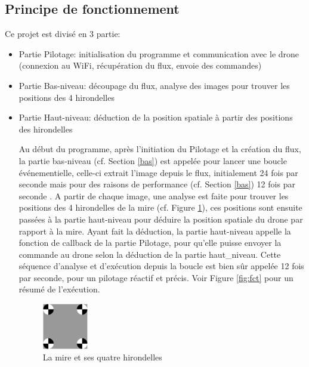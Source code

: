 \documentclass[12pt]{article}
\begin{document}
\subsection{Principe de fonctionnement\label{principe}}
Ce projet est divisé en 3 partie:
\begin{itemize}
    \item Partie Pilotage: initialisation du programme et communication avec le drone (connexion au WiFi, récupération du flux, envoie des commandes)
    \item Partie Bas-niveau: découpage du flux, analyse des images pour trouver les positions des 4 hirondelles
    \item Partie Haut-niveau: déduction de la position spatiale à partir des positions des hirondelles 
    
    Au début du programme, après l'initiation du Pilotage et la création du flux, la partie bas-niveau (cf. Section \ref{bas}) est appelée pour lancer une boucle événementielle, celle-ci extrait l'image depuis le flux, initialement 24 fois par seconde mais pour des raisons de performance (cf. Section \ref{bas}) 12 fois par seconde . A partir de chaque image, une analyse est faite pour trouver les positions des 4 hirondelles de la mire (cf. Figure \ref{fig:mire}), ces positions sont ensuite passées à la partie haut-niveau pour déduire la position spatiale du drone par rapport à la mire. Ayant fait la déduction, la partie haut-niveau appelle la fonction de callback de la partie Pilotage, pour qu'elle puisse envoyer la commande au drone selon la déduction de la partie haut\_niveau. Cette séquence d'analyse et d'exécution depuis la boucle est bien sûr appelée 12 fois par seconde, pour un pilotage réactif et précis. Voir Figure \ref{fig:fct} pour un résumé de l'exécution.
    \begin{figure}[H]
    \centering
    \includegraphics[width=2cm]{mire.png}
    \caption{La mire et ses quatre hirondelles}
    \label{fig:mire}
    \end{figure}
\end{itemize}
\end{document}

